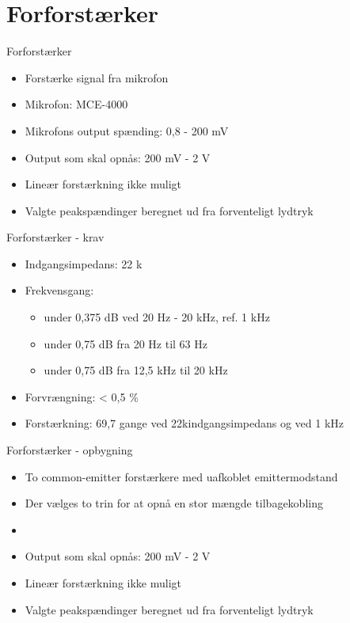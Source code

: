 \section{Forforstærker}

\begin{frame}{Forforstærker}
\begin{itemize}
\item Forstærke signal fra mikrofon
\item Mikrofon: MCE-4000
\item Mikrofons output spænding: 0,8 - 200 mV
\item Output som skal opnås: 200 mV - 2 V
\item Lineær forstærkning ikke muligt
\item Valgte peakspændinger beregnet ud fra forventeligt lydtryk
\end{itemize}
\end{frame}

\begin{frame}{Forforstærker - krav}
\begin{itemize}
\item Indgangsimpedans: 22 k\ohm
\item Frekvensgang: 
\begin{itemize}
\item  under 0,375 dB ved 20 Hz - 20 kHz, ref. 1 kHz 
\item  under 0,75 dB fra 20 Hz til 63 Hz 
\item  under 0,75 dB fra 12,5 kHz til 20 kHz
\end{itemize}
\item Forvrængning: < 0,5 \%
\item Forstærkning: 69,7 gange ved 22k\ohm indgangsimpedans og ved 1 kHz
\end{itemize}
\end{frame}

\begin{frame}{Forforstærker - opbygning}
\begin{itemize}
\item To common-emitter forstærkere med uafkoblet emittermodstand
\item Der vælges to trin for at opnå en stor mængde tilbagekobling
\item 
\item Output som skal opnås: 200 mV - 2 V
\item Lineær forstærkning ikke muligt
\item Valgte peakspændinger beregnet ud fra forventeligt lydtryk
\end{itemize}
\end{frame}